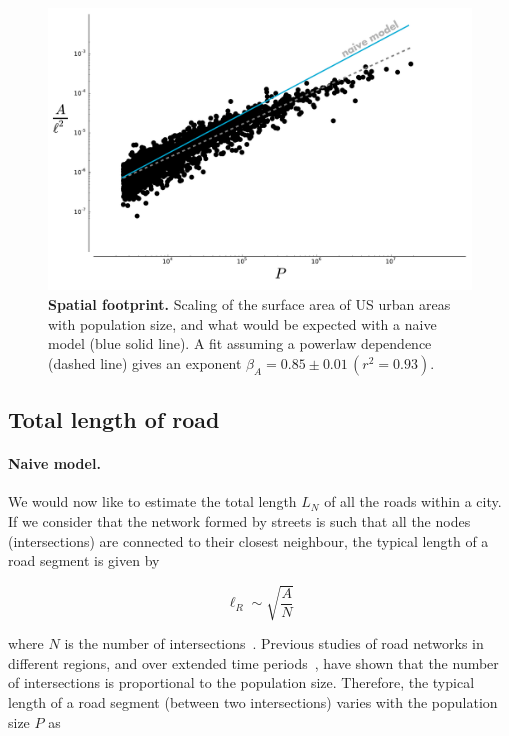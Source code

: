 \begin{figure}[!h]
    \centering
    \includegraphics[width=\textwidth]{gfx/chapter-scaling/scaling_area.pdf}
    \caption{{\bf Spatial footprint.} Scaling of the surface area of US urban areas with population size,
        and what would be expected with a naive model (blue solid line).
    A fit assuming a powerlaw dependence (dashed line) gives an exponent
    $\beta_A = 0.85 \pm 0.01\,(r^2 = 0.93)$.\label{fig:scaling_area}}
\end{figure}



\subsection{Total length of road}
\label{sub:total_length_of_road}

\paragraph{Naive model.} We would now like to estimate the total length $L_N$ of all the roads within a
city. If we consider that the network formed by streets is such that all the
nodes (intersections) are connected to their closest neighbour, the typical
length of a road segment is given by

\begin{equation}
    \ell_R \sim \sqrt{\frac{A}{N}}
\end{equation}

where $N$ is the number of intersections~\cite{Barthelemy:2008}. Previous studies of road networks in
different regions, and over extended time
periods~\cite{Strano:2012,Barthelemy:2013}, have shown that the number of
intersections is proportional to the population size. Therefore, the typical
length of a road segment (between two intersections) varies with the population
size $P$ as

